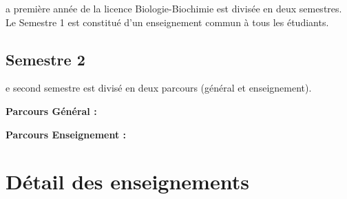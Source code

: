 \documentclass[10pt, a5paper]{report}
\begin{document}
\begin{spacing}{1.5}
a première année de la licence Biologie-Biochimie est divisée en deux semestres. Le Semestre 1 est constitué d'un enseignement commun à tous les étudiants. 



\newpage
\subsection*{Semestre 2}

e second semestre est divisé en deux parcours (général et enseignement). 

\textbf{Parcours Général :}
\newline



\newpage

\textbf{Parcours Enseignement :}
\newline


\section*{Détail des enseignements}



\end{spacing}
\end{document}

